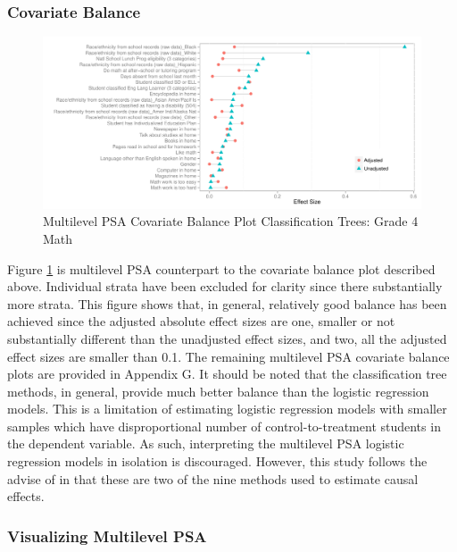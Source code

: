 \documentclass[letterpaper,12p,twoside]{article} %
\begin{document}
\subsubsection{Covariate Balance}

\begin{figure}[t]
\begin{center}
\includegraphics[width=\textwidth]{../Figures2009/g4math-mlpsa-ctree-balance.pdf}
\caption{Multilevel PSA Covariate Balance Plot Classification Trees: Grade 4 Math}
\label{fig:g4math-mlpsa-ctree-balance}
\end{center}
\end{figure}


Figure \ref{fig:g4math-mlpsa-ctree-balance} is multilevel PSA counterpart to the covariate balance plot described above. Individual strata have been excluded for clarity since there substantially more strata. This figure shows that, in general, relatively good balance has been achieved since the adjusted absolute effect sizes are one, smaller or not substantially different than the unadjusted effect sizes, and two, all the adjusted effect sizes are smaller than 0.1. The remaining multilevel PSA covariate balance plots are provided in Appendix G. It should be noted that the classification tree methods, in general, provide much better balance than the logistic regression models. This is a limitation of estimating logistic regression models with smaller samples which have disproportional number of control-to-treatment students in the dependent variable. As such, interpreting the multilevel PSA logistic regression models in isolation is discouraged. However, this study follows the advise of  in that these are two of the nine methods used to estimate causal effects.


\subsubsection{Visualizing Multilevel PSA}
\end{document}
